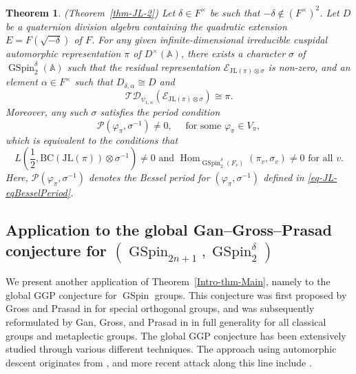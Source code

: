 \documentclass[12pt]{amsart}
\newcommand{\A}{\mathbb{A}}
\newcommand{\Hom}{\operatorname{Hom}}
\newcommand{\JL}{\mathrm{JL}}
\newcommand{\BC}{\mathrm{BC}}
\newcommand{\TD}{\mathcal{TD}}
\newcommand{\CE}{{\mathcal{E}}}
\newtheorem{theorem}{Theorem}[section]
\theoremstyle{remark}
\DeclareMathOperator{\GSpin}{GSpin}
\begin{document}
\begin{theorem}(Theorem~\ref{thm-JL-2})
\label{Intro-thm-JL-2}	
Let $\delta\in F^\times$ be such that $-\delta\not\in (F^\times)^2$. Let $D$ be a quaternion division algebra containing the quadratic extension $E=F(\sqrt{-\delta})$ of $F$. For any given infinite-dimensional irreducible cuspidal automorphic representation $\pi$ of $D^\times(\A)$, there exists a character $\sigma$ of $\GSpin_2^{\delta}(\A)$ such that the residual representation $\CE_{\JL(\pi)\otimes \sigma}$ is non-zero, and an element $\alpha\in F^\times$ such that $D_{\delta,\alpha}\cong D$ and 
\begin{equation*}
	\TD_{\psi_{1,\alpha}} (\CE_{\JL(\pi)\otimes\sigma})\cong \pi.
\end{equation*}
Moreover, any such $\sigma$ satisfies the period condition 
\begin{equation*}
	\mathcal{P}(\varphi_\pi, \sigma^{-1}) \not=0, \quad \text{ for some }\varphi_\pi \in V_\pi,
\end{equation*}
which is equivalent to the conditions that
\begin{equation*}
L(\frac{1}{2}, \BC(\JL(\pi))\otimes\sigma^{-1})\not=0 \text{ and } \Hom_{\GSpin_2^{\delta}(F_v)} (\pi_v,\sigma_v)\not=0 \text{ for all }v.	
\end{equation*}
Here, $\mathcal{P}(\varphi_\pi, \sigma^{-1})$ denotes the Bessel period for $(\varphi_\pi,\sigma^{-1})$ defined in \eqref{eq-JL-eqBesselPeriod}. 
\end{theorem}
 

\subsection{Application to the global Gan--Gross--Prasad conjecture for $(\GSpin_{2n+1}, \GSpin_2^\delta)$}
\label{subsection-Intro-application-GGP}
We present another application of Theorem~\ref{Intro-thm-Main}, namely to the global GGP conjecture for $\GSpin$ groups. This conjecture was first proposed by Gross and Prasad in \cite{GrossPrasad1992, GrossPrasad1994} for special orthogonal groups, and was subsequently reformulated by Gan, Gross, and Prasad in \cite{GanGrossPrasad2012} in full generality for all classical groups and metaplectic groups. The global GGP conjecture has been extensively studied through various different techniques. The approach using automorphic descent originates from \cite{GinzburgJiangRallis2004}, and more recent attack along this line include \cite{JiangZhang2020Annals, JiangLiuXu2020, LiuXu2023}. 
\end{document}
